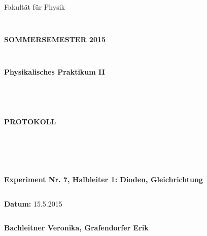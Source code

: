 \documentclass[12pt,a4paper,twopage]{article}
\begin{document}
\begin{verbatim}


\end{verbatim}

\thispagestyle{empty}
			\begin{center}
			\Large{Fakultät für Physik}\\
			\end{center}
\begin{verbatim}


\end{verbatim}
			\begin{center}
			\textbf{\LARGE SOMMERSEMESTER 2015}
			\end{center}
\begin{verbatim}


\end{verbatim}
			\begin{center}
			\textbf{\LARGE{Physikalisches Praktikum II}}
			\end{center}
\begin{verbatim}




\end{verbatim}

			\begin{center}
			\textbf{\LARGE{PROTOKOLL}}
			\end{center}
			
\begin{verbatim}





\end{verbatim}

			\begin{flushleft}
			\textbf{\Large{Experiment Nr. 7, Halbleiter 1: Dioden, Gleichrichtung}}\\
			\LARGE{}	
			\end{flushleft}

\begin{verbatim}

\end{verbatim}	
			\begin{flushleft}
			\textbf{\Large{Datum:}} \Large{15.5.2015}
			\end{flushleft}
			
\begin{verbatim}
\end{verbatim}
		\begin{flushleft}
			\textbf{\Large{Bachleitner Veronika, Grafendorfer Erik}} 
			\end{flushleft}
\end{document}
